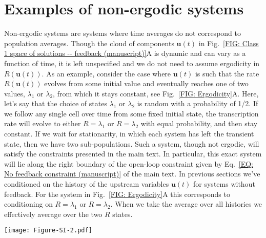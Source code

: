 \documentclass[%
 reprint,
superscriptaddress,
%
%
%
%
%
%
%
%
%
 amsmath,amssymb,
 aps,
%
%
%
%
%
%
onecolumn]{revtex4-2}
\begin{document}
{\section{Examples of non-ergodic systems}}
{
Non-ergodic systems are systems where time averages do not correspond to population averages. Though the cloud of components $\mathbf{u}(t)$ in Fig.~\ref{FIG: Class 1 space of solutions -- feedback (manuscript)}A is dynamic and can vary as a function of time, it is left unspecified and we do not need to assume ergodicity in $R(\mathbf{u}(t))$. As an example, consider the case where $\mathbf{u}(t)$ is such that the rate $R(\mathbf{u}(t))$ evolves from some initial value and eventually reaches one of two values, $\lambda_{1}$ or $\lambda_{2}$, from which it stays constant, see Fig.~\ref{FIG: Ergodicity}A. Here, let's say that the choice of states $\lambda_{1}$ or $\lambda_{2}$ is random with a probability of 1/2. If we follow any single cell over time from some fixed initial state, the transcription rate will evolve to either $R = \lambda_{1}$ or $R = \lambda_{2}$ with equal probability, and then stay constant. If we wait for stationarity, in which each system has left the transient state, then we have two sub-populations. Such a system, though not ergodic, will satisfy the constraints presented in the main text. In particular, this exact system will lie along the right boundary of the open-loop constraint given by Eq.~\eqref{EQ: No feedback constraint (manuscript)} of the main text. In previous sections we've conditioned on the history of the upstream variables $\mathbf{u}(t)$ for systems without feedback. For the system in Fig.~\ref{FIG: Ergodicity}A this corresponds to conditioning on $R = \lambda_{1}$ or $R = \lambda_{2}$. When we take the average over all histories we effectively average over the two $R$ states. 
}

\begin{figure*}[h]
\centering
  \texttt{[image: Figure-SI-2.pdf]}
   \vspace{-.5em}
   \caption{
    {\textbf{Irreversible cell states are non-ergodic processes.} A) Here are possible realizations of the transcription rate $R(\mathbf{u}(t))$ in a particular system within the class of Fig.~\ref{FIG: Class 1 space of solutions -- feedback (manuscript)}A in which the rate R either remains at the constant state of $R=\lambda_{1}$ or $R=\lambda_{2}$ after the initial transient dynamics have decayed. In each realization, the rate has a probability of $1/2$ of growing into the $R = \lambda_{1}$ state or into the $R = \lambda_{2}$ state. This could, for example, model a population of cells in which each cell must irreversibly switch to one of two states. This system is not ergodic, as following an individual cell over time can only provide information on the sub-population that shares that cell's state, and not the whole population. B) A similar system as A, with one of the states having an oscillating transcription rate and the other a stochastic transcription rate. }}
    \label{FIG: Ergodicity}
\end{figure*}
\end{document}
